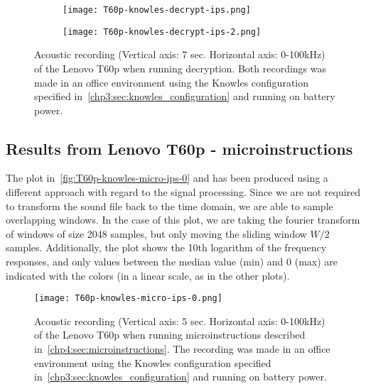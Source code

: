 \begin{figure}[ht]
    \begin{subfigure}{0.5\textwidth}
        \centering
        \texttt{[image: T60p-knowles-decrypt-ips.png]}
        \caption{}
        \label{fig:T60p-knowles-decrypt-ips}
    \end{subfigure}
    \begin{subfigure}{0.5\textwidth}
        \centering
        \texttt{[image: T60p-knowles-decrypt-ips-2.png]}
        \caption{}
        \label{fig:T60p-knowles-decrypt-ips-2}
    \end{subfigure}
    \caption{Acoustic recording (Vertical axis: 7 sec. Horizontal axis: 0-100kHz) of the Lenovo T60p when running decryption.
    Both recordings was made in an office environment using the Knowles configuration specified in~\autoref{chp3:sec:knowles_configuration} and running on battery power. }
    \label{fig:T60p-knowles-decrypt-ips}
\end{figure}

\subsection{Results from Lenovo T60p - microinstructions}\label{chp5:subsec:t60p_knowles_results_micro}
The plot in~\autoref{fig:T60p-knowles-micro-ips-0} and has been produced using a different approach with regard to the signal processing. 
Since we are not required to transform the sound file back to the time domain, we are able to sample overlapping windows.
In the case of this plot, we are taking the fourier transform of windows of size 2048 samples, but only moving the sliding window \({W/2}\) samples.
Additionally, the plot shows the 10th logarithm of the frequency responses, and only values between the median value (min) and 0 (max) are indicated with the colors (in a linear scale, as in the other plots). 
\begin{figure}[ht]
    \centering
    \texttt{[image: T60p-knowles-micro-ips-0.png]}
    \caption{Acoustic recording (Vertical axis: 5 sec. Horizontal axis: 0-100kHz) of the Lenovo T60p when running microinstructions described in~\autoref{chp4:sec:microinstructions}. The recording was made in an office environment using the Knowles configuration specified in~\autoref{chp3:sec:knowles_configuration} and running on battery power. }
    \label{fig:T60p-knowles-micro-ips-0}
\end{figure}
